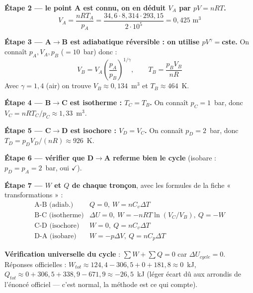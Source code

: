 \documentclass[11pt,a4paper]{article}
\begin{document}
\begin{etape}
\textbf{Étape 2 --- le point A est connu, on en déduit $V_A$ par $pV=nRT$.}
\[ V_A=\frac{nRT_A}{p_A}=\frac{34{,}6\cdot8{,}314\cdot293{,}15}{2\cdot10^5}=0{,}425\text{ m}^3 \]
\end{etape}

\begin{etape}
\textbf{Étape 3 --- A$\to$B est adiabatique réversible : on utilise $pV^\gamma=$cste.}
On connaît $p_A,V_A,p_B$ ($=10$~bar) donc :
\[ V_B=V_A\left(\frac{p_A}{p_B}\right)^{1/\gamma},\qquad
T_B=\frac{p_BV_B}{nR} \]
Avec $\gamma=1{,}4$ (air) on trouve $V_B\approx0{,}134$~m$^3$ et $T_B\approx464$~K.
\end{etape}

\begin{etape}
\textbf{Étape 4 --- B$\to$C est isotherme : $T_C=T_B$.} On connaît $p_C=1$~bar, donc
$V_C=nRT_C/p_C\approx1{,}33$~m$^3$.
\end{etape}

\begin{etape}
\textbf{Étape 5 --- C$\to$D est isochore : $V_D=V_C$.} On connaît $p_D=2$~bar, donc
$T_D=p_DV_D/(nR)\approx926$~K.
\end{etape}

\begin{etape}
\textbf{Étape 6 --- vérifier que D$\to$A referme bien le cycle} (isobare : $p_D=p_A=2$~bar,
oui $\checkmark$).
\end{etape}

\begin{etape}
\textbf{Étape 7 --- $W$ et $Q$ de chaque tronçon}, avec les formules de la fiche
« transformations » :
\[
\begin{array}{ll}
\text{A-B (adiab.)} & Q=0,\ W=n C_v\Delta T \\
\text{B-C (isotherme)} & \Delta U=0,\ W=-nRT\ln(V_C/V_B),\ Q=-W \\
\text{C-D (isochore)} & W=0,\ Q=nC_v\Delta T \\
\text{D-A (isobare)} & W=-p\Delta V,\ Q=nC_p\Delta T
\end{array}
\]
\end{etape}

\begin{verif}
\textbf{Vérification universelle du cycle} : $\sum W+\sum Q=0$ car $\Delta U_{cycle}=0$.
Réponses officielles  : $W_{tot}\approx124{,}4-306{,}5+0+181{,}8\approx0$~kJ,
$Q_{tot}\approx0+306{,}5+338{,}9-671{,}9\approx-26{,}5$~kJ (léger écart dû aux
arrondis de l'énoncé officiel --- c'est normal, la méthode est ce qui compte).
\end{verif}
\end{document}

